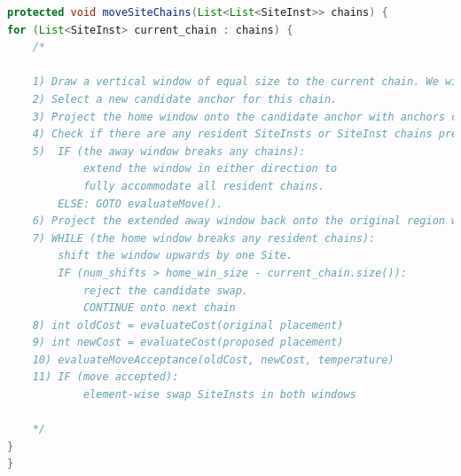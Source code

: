\begin{lstlisting}[language=java, caption={Chain Swapping}, label={lst:chain_swap_pseudocode}]
protected void moveSiteChains(List<List<SiteInst>> chains) {
for (List<SiteInst> current_chain : chains) {
    /*

    1) Draw a vertical window of equal size to the current chain. We will refer to this window as the "home window". 
    2) Select a new candidate anchor for this chain.
    3) Project the home window onto the candidate anchor with anchors coinciding. We will refer to this projected window as the "away window".
    4) Check if there are any resident SiteInsts or SiteInst chains present in the away window. Check if the away window breaks any resident SiteInst chains. 
    5)  IF (the away window breaks any chains): 
            extend the window in either direction to 
            fully accommodate all resident chains. 
        ELSE: GOTO evaluateMove(). 
    6) Project the extended away window back onto the original region with the tail of the window coinciding with the tail of the current chain. This projected window becomes the new home window. 
    7) WHILE (the home window breaks any resident chains):
        shift the window upwards by one Site. 
        IF (num_shifts > home_win_size - current_chain.size()):
            reject the candidate swap.
            CONTINUE onto next chain
    8) int oldCost = evaluateCost(original placement) 
    9) int newCost = evaluateCost(proposed placement) 
    10) evaluateMoveAcceptance(oldCost, newCost, temperature) 
    11) IF (move accepted):
            element-wise swap SiteInsts in both windows

    */
}
}
\end{lstlisting}

